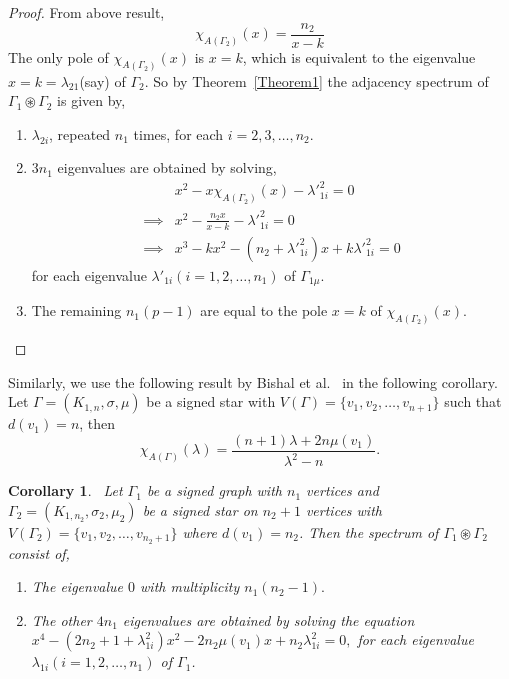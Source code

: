 \documentclass[12pt,a4paper]{article}
\newtheorem{corollary}{Corollary}[theorem]
\theoremstyle{definition}
\theoremstyle{remark}
\begin{document}
    \begin{proof}
        From above result, $$\chi_{A(\Gamma_2)}(x)=\frac{n_2}{x-k}$$
        The only pole of $\chi_{A(\Gamma_2)}(x)$ is $x=k$, which is equivalent to the eigenvalue $x=k=\lambda_{21}$(say) of $\Gamma_2$. So by Theorem~\ref{Theorem1} the adjacency spectrum of $\Gamma_1\circledast\Gamma_2$ is given by,
        \begin{enumerate}
            \item $\lambda_{2i}$, repeated $n_1$ times, for each $i=2,3,\ldots,n_2$.
            \item $3n_1$ eigenvalues are obtained by solving,
            \begin{equation*}
                \begin{split}
                    &x^2-x\chi_{A(\Gamma_2)}(x)-{\lambda'}_{1i}^2=0\\
                    \implies&x^2-\frac{n_2x}{x-k}-{\lambda'}_{1i}^2=0\\
                    \implies&x^3-kx^2-(n_2+{\lambda'}_{1i}^2)x+k{\lambda'}_{1i}^2=0
                \end{split}
            \end{equation*}
            for each eigenvalue ${\lambda'}_{1i}(i=1,2,\ldots,n_1)$ of $\Gamma_{1\mu}$.
            \item The remaining $n_1(p-1)$ are equal to the pole $x=k$ of $\chi_{A(\Gamma_2)}(x)$.
        \end{enumerate}
    \end{proof}

    Similarly, we use the following result by Bishal et al.~\cite{sonar2023spectrum} in the following corollary.\\
    Let $\Gamma=(K_{1,n},\sigma,\mu)$ be a signed star with $V(\Gamma)=\{v_1,v_2,\ldots,v_{n+1}\}$ such that $d(v_1)=n$, then \[\chi_{A(\Gamma)}(\lambda)=\frac{(n+1)\lambda+2n\mu(v_1)}{\lambda^2-n}.\]
    \begin{corollary}~\label{C2}
        Let $\Gamma_1$ be a signed graph with $n_1$ vertices and $\Gamma_2=(K_{1,n_2},\sigma_2,\mu_2)$ be a signed star on $n_2+1$ vertices with $V(\Gamma_2)=\{v_1,v_2,\ldots,v_{n_2+1}\}$ where $d(v_1)=n_2$. Then the spectrum of $\Gamma_1\circledast\Gamma_2$ consist of,
        \begin{enumerate}
            \item The eigenvalue $0$ with multiplicity $n_1(n_2-1).$
            \item The other $4n_1$ eigenvalues are obtained by solving the equation $x^4-(2n_2+1+{\lambda}_{1i}^2)x^2-2n_2\mu(v_1)x+n_2{\lambda}_{1i}^2=0,$ for each eigenvalue ${\lambda}_{1i}(i=1,2,\ldots,n_1)$ of $\Gamma_{1}$.
        \end{enumerate}
    \end{corollary}
\end{document}
